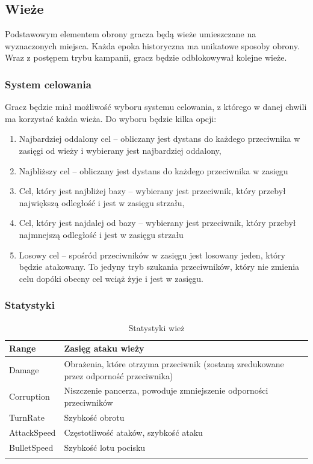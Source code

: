 \documentclass[a4paper,12pt, twoside, titlepage]{article}
\begin{document}
\subsection{Wieże}
Podstawowym elementem obrony gracza będą wieże umieszczane na wyznaczonych miejsca. Każda epoka historyczna ma unikatowe sposoby obrony. Wraz z postępem trybu kampanii, gracz będzie odblokowywał kolejne wieże.

\subsubsection{System celowania}
Gracz będzie miał możliwość wyboru systemu celowania, z którego w danej chwili ma korzystać każda wieża. Do wyboru będzie kilka opcji:
\begin{enumerate}
	\item Najbardziej oddalony cel -- obliczany jest dystans do każdego przeciwnika w zasięgi od wieży i wybierany jest najbardziej oddalony,
	\item Najbliższy cel -- obliczany jest dystans do każdego przeciwnika w zasięgu 
	\item Cel, który jest najbliżej bazy -- wybierany jest przeciwnik, który przebył największą odległość i jest w zasięgu strzału,
	\item Cel, który jest najdalej od bazy -- wybierany jest przeciwnik, który przebył najmnejszą odległość i jest w zasięgu strzału
	\item Losowy cel -- spośród przeciwników w zasięgu jest losowany jeden, który będzie atakowany. To jedyny tryb szukania przeciwników, który nie zmienia celu dopóki obecny cel wciąż żyje i jest w zasięgu.
\end{enumerate}

\subsubsection{Statystyki}

\begin{center}
\begin{longtable}{| p{} | p{} |} 
	\hline
	Range
	& Zasięg ataku wieży \\
	\hline
	Damage
	& Obrażenia, które otrzyma przeciwnik (zostaną zredukowane przez odporność przeciwnika) \\ 
	\hline 
	Corruption
	& Niszczenie pancerza, powoduje zmniejszenie odporności przeciwników \\ 
	\hline
	TurnRate
	& Szybkość obrotu \\ 
	\hline
	AttackSpeed
	& Częstotliwość ataków, szybkość ataku \\ 
	\hline
	BulletSpeed
	& Szybkość lotu pocisku \\ 
	\hline

	\caption{Statystyki wież}	
\end{longtable}
\end{center}
\end{document}
